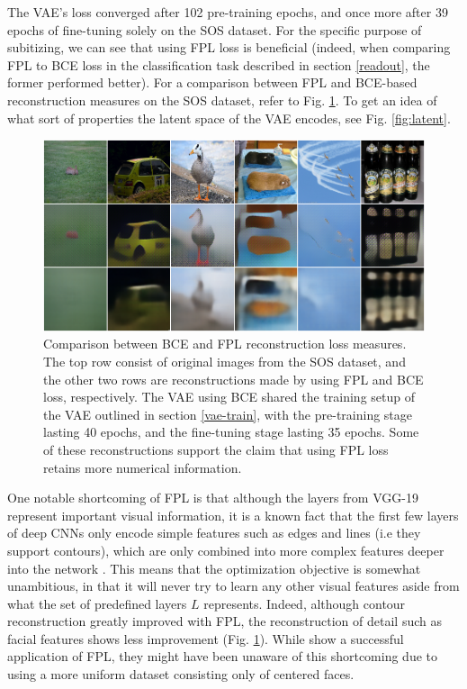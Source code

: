 \documentclass[twocolumn]{article}
\begin{document}
The VAE's loss converged after 102 pre-training epochs, and once more after 39 epochs of fine-tuning solely on the SOS dataset. For the specific purpose of subitizing, we can see that using FPL loss
is beneficial (indeed, when comparing FPL to BCE loss in the classification task described in
section \ref{readout}, the former performed better). For a
comparison between FPL and BCE-based reconstruction measures on the SOS
dataset, refer to Fig. \ref{fig:dfc_comp}. To get an idea of what sort of
properties the latent space of the VAE encodes, see Fig. \ref{fig:latent}.

\begin{figure}
\centering
\includegraphics{dfc_bce.png}
\caption{Comparison between BCE and FPL reconstruction loss measures. The top row consist of original images from the SOS dataset, and the other two rows are reconstructions made by using FPL and BCE loss, respectively. The VAE using BCE shared the training setup of the VAE outlined in section \ref{vae-train}, with the pre-training stage lasting 40 epochs, and the fine-tuning stage lasting 35 epochs. Some of these reconstructions support the claim that using FPL loss retains more numerical information.}
\label{fig:dfc_comp}
\end{figure}

One notable shortcoming of FPL is that although the
layers from VGG-19 represent important visual information, it is a known
fact that the first few layers of deep CNNs only encode simple features
such as edges and lines (i.e they support contours), which are only
combined into more complex features deeper into the network
\citetext{\citealp{liu2017towards}; \citealp[FPL's authors][ note
something similar]{hou2017deep}}. This means that the optimization
objective is somewhat unambitious, in that it will never try to learn
any other visual features \citep[for examples, refer to][Fig.
6.]{liu2017towards} aside from what the set of predefined layers \(L\)
represents. Indeed, although contour reconstruction greatly improved
with FPL, the reconstruction of detail such as facial features shows
less improvement (Fig. \ref{fig:dfc_comp}). While \citet{hou2017deep} show a successful
application of FPL, they might have been unaware of this shortcoming due
to using a more uniform dataset consisting only of centered faces. 
\end{document}
